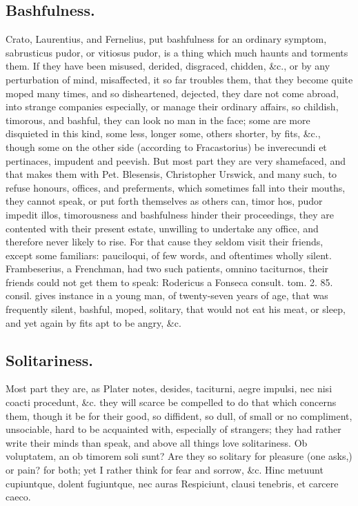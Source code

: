 {\subsection{Bashfulness.}
Crato, Laurentius, and Fernelius, put
bashfulness for an ordinary symptom, sabrusticus pudor, or vitiosus
pudor, is a thing which much haunts and torments them. If they have
been misused, derided, disgraced, chidden, \&c., or by any perturbation
of mind, misaffected, it so far troubles them, that they become quite
moped many times, and so disheartened, dejected, they dare not come
abroad, into strange companies especially, or manage their ordinary
affairs, so childish, timorous, and bashful, they can look no man in
the face; some are more disquieted in this kind, some less, longer
some, others shorter, by fits, \&c., though some on the other side
(according to Fracastorius) be inverecundi et pertinaces,
impudent and peevish. But most part they are very shamefaced, and that
makes them with Pet. Blesensis, Christopher Urswick, and many such, to
refuse honours, offices, and preferments, which sometimes fall into
their mouths, they cannot speak, or put forth themselves as others can,
timor hos, pudor impedit illos, timorousness and bashfulness hinder
their proceedings, they are contented with their present estate,
unwilling to undertake any office, and therefore never likely to rise.
For that cause they seldom visit their friends, except some familiars:
pauciloqui, of few words, and oftentimes wholly silent. 
Frambeserius, a Frenchman, had two such patients, omnino taciturnos,
their friends could not get them to speak: Rodericus a Fonseca consult.
tom. 2. 85. consil. gives instance in a young man, of twenty-seven
years of age, that was frequently silent, bashful, moped, solitary,
that would not eat his meat, or sleep, and yet again by fits apt to be
angry, \&c.

\subsection{Solitariness.}
Most part they are, as Plater notes, desides,
taciturni, aegre impulsi, nec nisi coacti procedunt, \&c. they will
scarce be compelled to do that which concerns them, though it be for
their good, so diffident, so dull, of small or no compliment,
unsociable, hard to be acquainted with, especially of strangers; they
had rather write their minds than speak, and above all things love
solitariness. Ob voluptatem, an ob timorem soli sunt? Are they so
solitary for pleasure (one asks,) or pain? for both; yet I rather think
for fear and sorrow, \&c.
Hinc metuunt cupiuntque, dolent fugiuntque, nec auras
Respiciunt, clausi tenebris, et carcere caeco.

}
